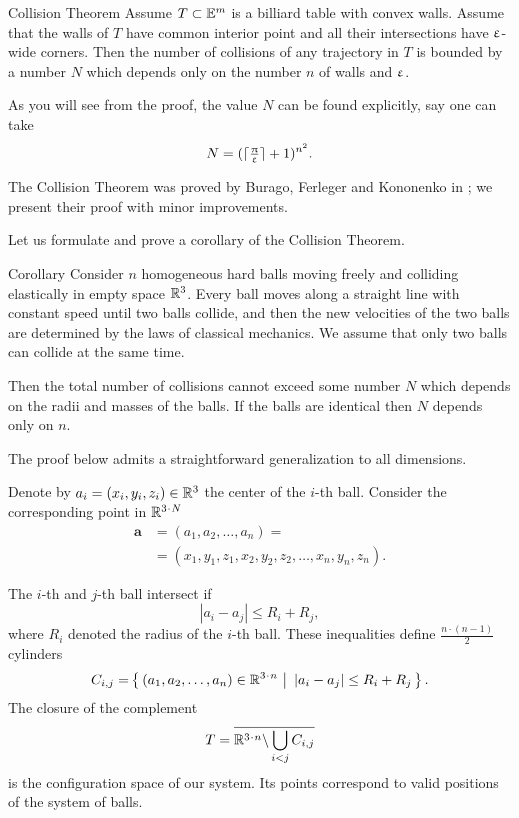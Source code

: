 \begin{thm}{Collision Theorem}\label{thm:collision}
Assume $T\subset\EE^m$
is a billiard table with convex walls.
Assume that the walls of $T$ have common interior point 
and all their intersections have $\upvarepsilon$-wide corners.
Then the number of collisions of any trajectory in  $T$  is bounded
by a number $N$ which depends only on the number $n$ of walls and $\upvarepsilon$.
\end{thm}

As you will see from the proof,
the value $N$ can be found explicitly,
say one can take 
\[N=(\lceil\tfrac{\uppi}{\upvarepsilon}\rceil+1)^{n^2}.\]

The Collision Theorem was proved by Burago, Ferleger and Kononenko in \cite{BFK};
we present their proof with minor improvements.

Let us formulate and prove a corollary of the  Collision Theorem.

\begin{thm}{Corollary}\label{cor:balls}
Consider $n$ homogeneous hard balls
moving freely and colliding
elastically in empty space $\mathbb{R}^3$. 
Every ball moves
along a straight line with constant speed until two balls collide, and then
the new velocities of the two balls are determined by the
laws of classical mechanics. 
We assume that only two balls can collide at the same time.

Then the total number of collisions cannot exceed some number $N$ which depends on the radii and masses of the balls.
If the balls are identical then $N$ depends only on $n$.
\end{thm}


The proof below admits a straightforward generalization to all dimensions.

Denote by $a_i=(x_i,y_i,z_i) \in \RR^3$ the center of the $i$-th ball.
Consider the corresponding point in $\RR^{3\cdot N}$
\begin{align*}
\bm{a}&=(a_1, a_2 , \dots , a_n ) =
\\
&=(x_1, y_1 , z_1 , x_2 , y_2 , z_2 , \dots , x_n , y_n , z_n).
\end{align*}

The $i$-th and $j$-th ball intersect if 
$$|a_i - a_j | \le R_i+R_j,$$
where $R_i$ denoted the radius of the $i$-th ball.
These inequalities define $\tfrac{n\cdot(n-1)}{2}$ cylinders 
\[C_{i,j}=\set{(a_1, a_2 , \dots , a_n )\in\RR^{3\cdot n}} {|a_i - a_j | \le R_i+R_j}.\] 
The closure of the complement
\[T=\overline{\RR^{3\cdot n}\backslash \bigcup_{i< j} C_{i,j}}\] 
is the configuration space of our system. 
Its points correspond
to valid positions of the system of balls.


